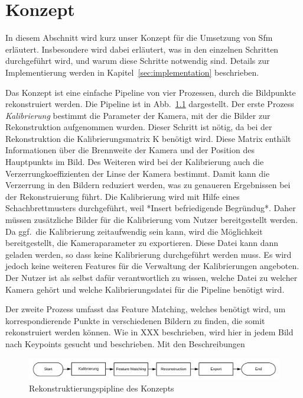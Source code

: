 
\chapter{Konzept}
In diesem Abschnitt wird kurz unser Konzept für die Umsetzung von Sfm erläutert. 
Insbesondere wird dabei erläutert, was in den einzelnen Schritten durchgeführt wird, und warum diese Schritte notwendig sind.
Details zur Implementierung werden in Kapitel~\ref{sec:implementation} beschrieben.

Das Konzept ist eine einfache Pipeline von vier Prozessen, durch die Bildpunkte rekonstruiert werden.
Die Pipeline ist in Abb.~\ref{fig:concept-pipeline} dargestellt.
Der erste Prozess \emph{Kalibrierung} bestimmt die Parameter der Kamera, mit der die Bilder zur Rekonstruktion aufgenommen wurden.
Dieser Schritt ist nötig, da bei der Rekonstruktion die Kalibrierungsmatrix K benötigt wird.
Diese Matrix enthält Informationen über die Brennweite der Kamera und der Position des Hauptpunkts im Bild.
Des Weiteren wird bei der Kalibrierung auch die Verzerrungkoeffizienten der Linse der Kamera bestimmt. %
Damit kann die Verzerrung in den Bildern reduziert werden, was zu genaueren Ergebnissen bei der Rekonstruierung führt.%
Die Kalibrierung wird mit Hilfe eines Schachbrettmusters durchgeführt, weil *Insert befriedigende Begründug*.
Daher müssen zusätzliche Bilder für die Kalibrierung vom Nutzer bereitgestellt werden.
Da ggf.\ die Kalibrierung zeitaufwendig sein kann, wird die Möglichkeit bereitgestellt, die Kameraparameter zu exportieren.
Diese Datei kann dann geladen werden, so dass keine Kalibrierung durchgeführt werden muss. 
Es wird jedoch keine weiteren Features für die Verwaltung der Kalibrierungen angeboten.
Der Nutzer ist als selbst dafür verantwortlich zu wissen, welche Datei zu welcher Kamera gehört und welche Kalibrierungsdatei für die Pipeline benötigt wird. 

Der zweite Prozess umfasst das Feature Matching, welches benötigt wird, um korrespondierende Punkte in verschiedenen Bildern zu finden, die somit rekonstruiert werden können.
Wie in XXX beschrieben, wird hier in jedem Bild nach Keypoints gesucht und beschrieben.
Mit den Beschreibungen 







\begin{figure}
    \centering
    \includegraphics{src/img/konzept-pipeline-horizontal.png}
    \caption{Rekonstruktierungspipline des Konzepts}
    \label{fig:concept-pipeline}
\end{figure}
